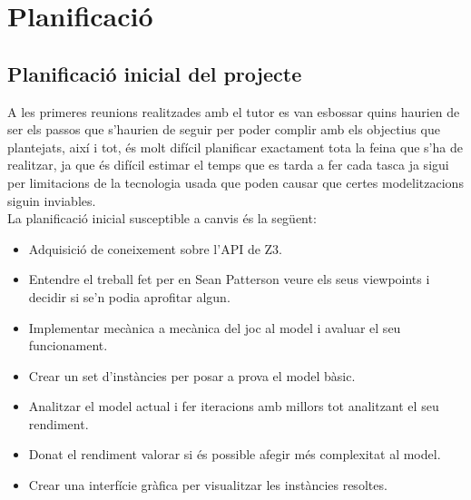 


\chapter{Planificació}

\label{Planificació}

\section{Planificació inicial del projecte}
A les primeres reunions realitzades amb el tutor es van esbossar quins haurien de ser els passos que s'haurien de seguir per poder complir amb els objectius que plantejats, així i tot, és molt difícil planificar exactament tota la feina que s'ha de realitzar, ja que és difícil estimar el temps que es tarda a fer cada tasca ja sigui per limitacions de la tecnologia usada que poden causar que certes modelitzacions siguin inviables.\\

La planificació inicial susceptible a canvis és la següent:

\begin{itemize}
    \item Adquisició de coneixement sobre l'API de Z3.
    \item Entendre el treball fet per en Sean Patterson veure els seus viewpoints i decidir si se'n podia aprofitar algun.
    \item Implementar mecànica a mecànica del joc al model i avaluar el seu funcionament.
    \item Crear un set d'instàncies per posar a prova el model bàsic.
    \item Analitzar el model actual i fer iteracions amb millors tot analitzant el seu rendiment.
    \item Donat el rendiment valorar si és possible afegir més complexitat al model.
    \item Crear una interfície gràfica per visualitzar les instàncies resoltes.
\end{itemize}

